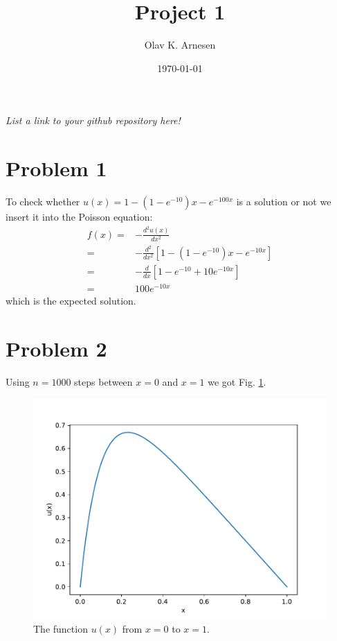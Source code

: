 \documentclass[english,notitlepage]{revtex4-2}  %
\begin{document}
\title{Project 1}      %
\author{Olav K. Arnesen}          %
\date{\today}                             %
\noaffiliation                            %

\maketitle 

\textit{List a link to your github repository here!}

\section*{Problem 1}
To check whether $u(x)=1-(1-e^{-10})x-e^{-100x}$ is a solution or not we insert it into the Poisson equation:
\begin{equation}
	\begin{split}	
		f(x)=&-\frac{d^2u(x)}{dx^2} \\
		=&-\frac{d^2}{dx^2}\left[1-\left(1-e^{-10}\right)x-e^{-10x}\right] \\ 
		=&-\frac{d}{dx}\left[1-e^{-10}+10e^{-10x}\right] \\
		=&100e^{-10x}
	\end{split} 
\end{equation}
which is the expected solution.

\section*{Problem 2}
Using $n=1000$ steps between $x=0$ and $x=1$ we got Fig. \ref{fig:1}.

\begin{figure}
	\includegraphics[scale=0.9]{imgs/problem2_output.pdf}
	\caption{The function $u(x)$ from $x=0$ to $x=1$.}
	\label{fig:1}
\end{figure}
\end{document}
